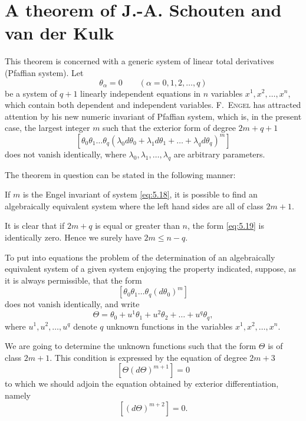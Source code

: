 \section{A theorem of J.-A. Schouten and van der Kulk}
\label{sec:theorem-j.-a}

\fsec This theorem is concerned with a generic system of linear total derivatives (Pfaffian system). Let
\begin{equation}
  \label{eq:5.18}
  \theta_{\alpha}=0\qquad(\alpha=0,1,2,\dots,q)
\end{equation}
be a system of $q+1$ linearly independent equations in $n$ variables $x^{1},x^{2},\dots,x^{n}$, which contain both dependent and independent variables. \textsc{F.~Engel} has attracted attention by his new numeric invariant of Pfaffian system, which is, in the present case, the largest integer $m$ such that the exterior form of degree $2m+q+1$
\begin{equation}
  \label{eq:5.19}
  [\theta_{0}\theta_{1}\dots\theta_{q}(\lambda_{0}d\theta_{0}+\lambda_{1}d\theta_{1}+\dots+\lambda_{q}d\theta_{q})^{m}]
\end{equation}
does not vanish identically, where $\lambda_{0},\lambda_{1},\dots,\lambda_{q}$ are arbitrary parameters.

The theorem in question can be stated in the following manner:
\begin{thm*}
  If $m$ is the Engel invariant of system \eqref{eq:5.18}, it is possible to find an algebraically equivalent system where the left hand sides are all of class $2m+1$.
\end{thm*}

It is clear that if $2m+q$ is equal or greater than $n$, the form \eqref{eq:5.19} is identically zero. Hence we surely have $2m\le n-q$.

\vspace{12pt}\fsec To put into equations the problem of the determination of an algebraically equivalent system of a given system enjoying the property indicated, suppose, as it is always permissible, that the form
\[
[\theta_{0}\theta_{1}\dots\theta_{q}(d\theta_{0})^{m}]
\]
does not vanish identically, and write
\[
\Theta=\theta_{0}+u^{1}\theta_{1}+u^{2}\theta_{2}+\dots+u^{q}\theta_{q},
\]
where $u^{1},u^{2},\dots,u^{q}$ denote $q$ unknown functions in the variables $x^{1},x^{2},\dots,x^{n}$.

We are going to determine the unknown functions such that the form $\Theta$ is of class $2m+1$. This condition is expressed by the equation of degree $2m+3$
\begin{equation}
  \label{eq:5.20}
  [\Theta(d\Theta)^{m+1}]=0
\end{equation}
to which we should adjoin the equation obtained by exterior differentiation, namely
\begin{equation}
  \label{eq:5.21}
  [(d\Theta)^{m+2}]=0.
\end{equation}

